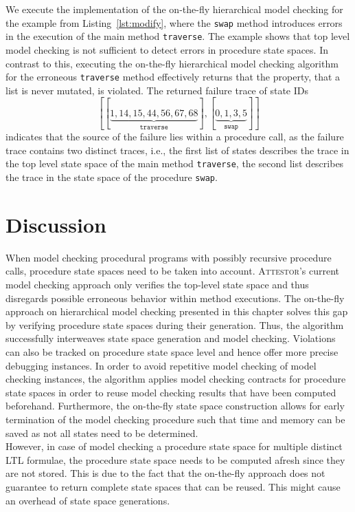 \documentclass[a4paper, 12pt, twoside]{report}
\begin{document}
	We execute the implementation of the on-the-fly hierarchical model checking for the example from Listing~\ref{lst:modify}, where the \texttt{swap} method introduces errors in the execution of the main method \texttt{traverse}. The example shows that top level model checking is not sufficient to detect errors in procedure state spaces. In contrast to this, executing the on-the-fly hierarchical model checking algorithm for the erroneous \texttt{traverse} method effectively returns that the property, that a list is never mutated, is violated. The returned failure trace of state IDs \[[[\underbrace{1, 14, 15, 44, 56, 67, 68}_{\texttt{traverse}}], [\underbrace{0, 1, 3, 5}_{\texttt{swap}}]]\] indicates that the source of the failure lies within a procedure call, as the failure trace contains two distinct traces, i.e., the first list of states describes the trace in the top level state space of the main method \texttt{traverse}, the second list describes the trace in the state space of the procedure \texttt{swap}.
	
	\section{Discussion}
	
	When model checking procedural programs with possibly recursive procedure calls, procedure state spaces need to be taken into account. \textsc{Attestor}'s current model checking approach only verifies the top-level state space and thus disregards possible erroneous behavior within method executions. The on-the-fly approach on hierarchical model checking presented in this chapter solves this gap by verifying procedure state spaces during their generation. Thus, the algorithm successfully interweaves state space generation and model checking. Violations can also be tracked on procedure state space level and hence offer more precise debugging instances. In order to avoid repetitive model checking of model checking instances, the algorithm applies model checking contracts for procedure state spaces in order to reuse model checking results that have been computed beforehand. Furthermore, the on-the-fly state space construction allows for early termination of the model checking procedure such that time and memory can be saved as not all states need to be determined. \\
	
	However, in case of model checking a procedure state space for multiple distinct LTL formulae, the procedure state space needs to be computed afresh since they are not stored. This is due to the fact that the on-the-fly approach does not guarantee to return complete state spaces that can be reused. This might cause an overhead of state space generations.\\
	
\end{document}
